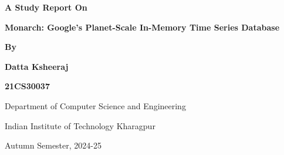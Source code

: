 \documentclass[12pt, a4paper, oneside]{Thesis} %
\title{\ttitle} %
\begin{document}



\frontmatter %


\fancyhead{} %
\rhead{\thepage} %
\lhead{} %


\newcommand{\HRule}{\rule{\linewidth}{0.5mm}} %

\hypersetup{pdfsubject=\subjectname}
\hypersetup{pdfauthor=\authornames}
\hypersetup{pdfkeywords=\keywordnames}

\begin{titlepage}
    \centering
    \vspace*{2cm}
    
    {\huge \bfseries A Study Report On}
    
    \vspace{1.5cm}
    
    {\LARGE \bfseries Monarch: Google’s Planet-Scale In-Memory Time Series Database}
    
    \vspace{2cm}
    
    {\large \bfseries By}
    
    \vspace{0.5cm}
    
    {\Large \bfseries Datta Ksheeraj}
    
    \vspace{0.5cm}
    
    {\Large \bfseries 21CS30037}
    
    \vfill
    
    {\large Department of Computer Science and Engineering}
    
    
    {\large Indian Institute of Technology Kharagpur}
    
    
    {\large Autumn Semester, 2024-25}
    
\end{titlepage}
\end{document}
